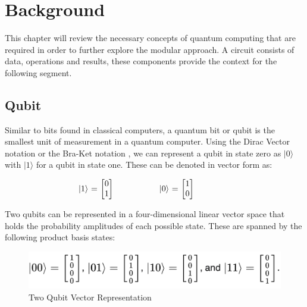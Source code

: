 \chapter{Background}\label{BackgroundLit}
This chapter will review the necessary concepts of quantum computing that are required in order to further explore the modular approach. 
A circuit consists of data, operations and results, these components provide the context for the following segment.


\section{Qubit} \label{QubitBackG}

Similar to bits found in classical computers, a quantum bit or qubit is the smallest unit of measurement in a quantum computer. Using the Dirac Vector notation or the Bra-Ket notation \citep{wikiVec}, we can represent a qubit in state zero as $|0\rangle$ with $|1\rangle$ for a qubit in state one. These can be denoted in vector form as:



\begin{equation}
    \begin{tabular}{p{3cm}p{3cm}}
        $|1\rangle$ = 
            $\begin{bmatrix}
                0 \\
                1
            \end{bmatrix}$
        & 
        $|0\rangle$ = 
           $\begin{bmatrix}
                1 \\
                0
            \end{bmatrix}$
    \end{tabular}
\label{qubitVector}
\end{equation}



Two qubits can be represented in a four-dimensional linear vector space that holds the probability amplitudes of each possible state. These are spanned by the following product basis states: 

\begin{figure}[H]
      \centering
      \includegraphics[scale=0.6]{background/fourVec.png}
      \caption{Two Qubit Vector Representation \citep{wikiVec}}
      \label{fourVec}
\end{figure}

